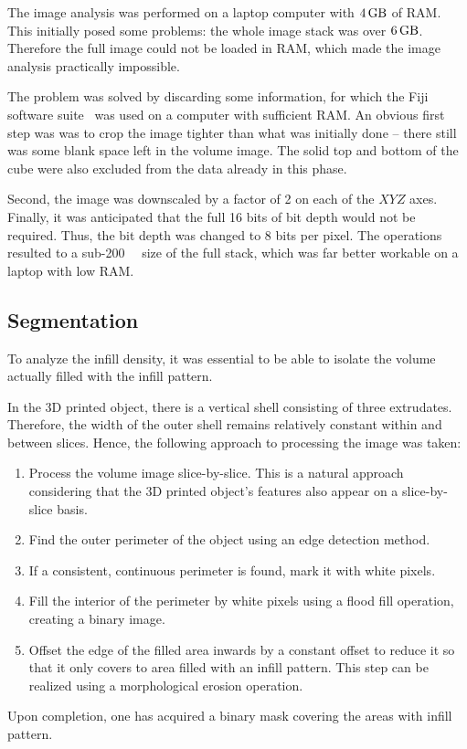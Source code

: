 \documentclass[a4paper,twoside,12pt]{article}
\begin{document}
The image analysis was performed on a laptop computer with $\SI{4}{\giga\byte}$ of RAM. This initially posed some problems: the whole image stack was over $\SI{6}{\giga\byte}$. Therefore the full image could not be loaded in RAM, which made the image analysis practically impossible.

The problem was solved by discarding some information, for which the Fiji software suite~\cite{fiji} was used on a computer with sufficient RAM. An obvious first step was was to crop the image tighter than what was initially done -- there still was some blank space left in the volume image. The solid top and bottom of the cube were also excluded from the data already in this phase.

Second, the image was downscaled by a factor of 2 on each of the $XYZ$ axes. Finally, it was anticipated that the full 16 bits of bit depth would not be required. Thus, the bit depth was changed to 8 bits per pixel. The operations resulted to a sub-\SI{200}{\mega\byte} size of the full stack, which was far better workable on a laptop with low RAM.

\subsection{Segmentation}
To analyze the infill density, it was essential to be able to isolate the volume actually filled with the infill pattern.

In the 3D printed object, there is a vertical shell consisting of three extrudates. Therefore, the width of the outer shell remains relatively constant within and between slices. Hence, the following approach to processing the image was taken:
\begin{enumerate}
    \item Process the volume image slice-by-slice. This is a natural approach considering that the 3D printed object's features also appear on a slice-by-slice basis.
    \item Find the outer perimeter of the object using an edge detection method.
    \item If a consistent, continuous perimeter is found, mark it with white pixels.
    \item Fill the interior of the perimeter by white pixels using a flood fill operation, creating a binary image.
    \item \label{step:erosion} Offset the edge of the filled area inwards by a constant offset to reduce it so that it only covers to area filled with an infill pattern. This step can be realized using a morphological erosion operation.
\end{enumerate}
Upon completion, one has acquired a binary mask covering the areas with infill pattern.
\end{document}
